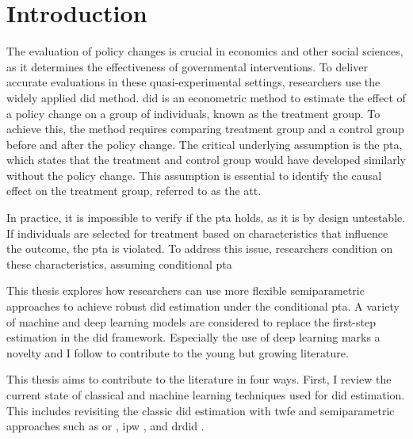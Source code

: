 \section{Introduction}



The evaluation of policy changes is crucial in economics and other social sciences, as it determines the effectiveness of governmental interventions.
To deliver accurate evaluations in these quasi-experimental settings, researchers use the widely applied \ac{did} method.
\ac{did} is an econometric method to estimate the effect of a policy change on a group of individuals, known as the treatment group.
To achieve this, the method requires comparing treatment group and a control group before and after the policy change.
The critical underlying assumption is the \ac{pta}, which states that the treatment and control group would have developed similarly without the policy change.
This assumption is essential to identify the causal effect on the treatment group, referred to as the \ac{att}.

In practice, it is impossible to verify if the \ac{pta} holds, as it is by design untestable.
If individuals are selected for treatment based on characteristics that influence the outcome, the \ac{pta} is violated.
To address  this issue, researchers condition on these characteristics, assuming conditional \ac{pta} \citep[see][]{santannaDoublyRobustDifferenceindifferences2020,manfeDifferenceInDifferenceDesignRepeated}

This thesis explores how researchers can use more flexible semiparametric approaches to achieve robust \ac{did} estimation under the conditional \ac{pta}.
A variety of machine and deep learning models are considered to replace the first-step estimation in the \ac{did} framework.
Especially the use of deep learning marks a novelty and I follow \citet{farrellDeepNeuralNetworks2021} to contribute to the young but growing literature.

This thesis aims to contribute to the literature in four ways.
First, I review the current state of classical and machine learning techniques used for \ac{did} estimation.
This includes revisiting the classic \ac{did} estimation with \ac{twfe} and semiparametric approaches such as \ac{or} \citep[see][]{heckmanMatchingEconometricEvaluation1998}, \ac{ipw} \citep[see][]{abadieSemiparametricDifferenceinDifferencesEstimators2005}, and \ac{drdid} \citep[see][]{santannaDoublyRobustDifferenceindifferences2020}.

